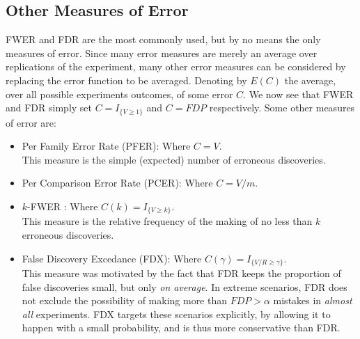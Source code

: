 \documentclass[review,12pt]{article}
\begin{document}
\subsection{\label{sec:other_measures}Other Measures of Error}
FWER and FDR are the most commonly used, but by no means the only measures of error. Since many error measures are merely an average over replications of the experiment, many other error measures can be considered by replacing the error function to be averaged. Denoting by $E(C)$ the average, over all possible experiments outcomes, of some error $C$. We now see that FWER and FDR simply set  $C = I_{\{ V \geq 1 \} } $ and $C = FDP$ respectively.
Some other measures of error are:



\begin{itemize}

\item Per Family Error Rate (PFER): Where $C=V$.\\
This measure is the simple (expected) number of erroneous discoveries. 

\item Per Comparison Error Rate (PCER): Where $C=V/m$.

\item $k$-FWER \citep{van_der_laan_augmentation_2004}: Where $C(k) = I_{\{ V \geq k \} }$.\\
This measure is the relative frequency of the making of no less than $k$ erroneous discoveries.

\item False Discovery Excedance (FDX)\citep{genovese_exceedance_2006}: Where $C(\gamma) = I_{\{ V/R \geq \gamma \} }$.\\
This measure was motivated by the fact that FDR keeps the proportion of false discoveries small, but only \emph{on average}. 
In extreme scenarios, FDR does not exclude the possibility of making more than $FDP>\alpha$ mistakes in \emph{almost all} experiments. FDX targets these scenarios explicitly, by allowing it to happen with a small probability, and is thus more conservative than FDR. 

\end{itemize}
\end{document}

